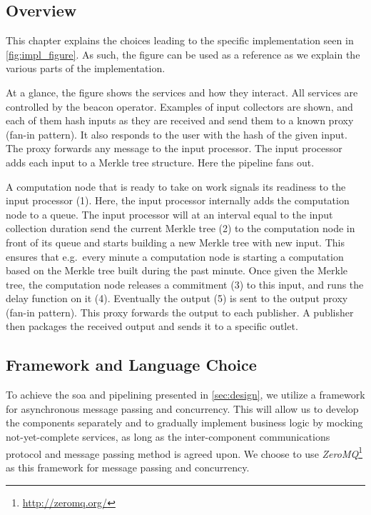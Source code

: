 \subsection{Overview}%
\label{sub:overview}
This chapter explains the choices leading to the specific implementation seen in \vref{fig:impl_figure}.
As such, the figure can be used as a reference as we explain the various parts of the implementation.

At a glance, the figure shows the services and how they interact.
All services are controlled by the beacon operator.
Examples of input collectors are shown, and each of them hash inputs as they are received and send them to a known proxy (fan-in pattern).
It also responds to the user with the hash of the given input.
The proxy forwards any message to the input processor.
The input processor adds each input to a Merkle tree structure.
Here the pipeline fans out.

A computation node that is ready to take on work signals its readiness to the input processor (1).
Here, the input processor internally adds the computation node to a queue.
The input processor will at an interval equal to the input collection duration send the current Merkle tree (2) to the computation node in front of its queue and starts building a new Merkle tree with new input.
This ensures that e.g.\ every minute a computation node is starting a computation based on the Merkle tree built during the past minute.
Once given the Merkle tree, the computation node releases a commitment (3) to this input, and runs the delay function on it (4).
Eventually the output (5) is sent to the output proxy (fan-in pattern).
This proxy forwards the output to each publisher.
A publisher then packages the received output and sends it to a specific outlet.

\subsection{Framework and Language Choice}
To achieve the \acrfull{soa} and pipelining presented in \cref{sec:design}, we utilize a framework for asynchronous message passing and concurrency.
This will allow us to develop the components separately and to gradually implement business logic by mocking not-yet-complete services, as long as the inter-component communications protocol and message passing method is agreed upon.
We choose to use \textit{ZeroMQ}\footnote{\url{http://zeromq.org/}} as this framework for message passing and concurrency.

